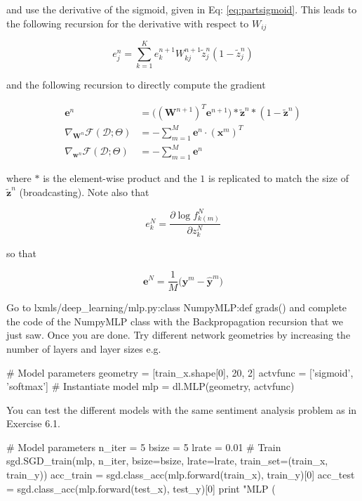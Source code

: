 \noindent and use the derivative of the sigmoid, given in Eq: \ref{eq:partsigmoid}. This leads to the following recursion for the derivative with respect to $W_{ij}$

\begin{equation}
e^{n}_j = \sum_{k=1}^K e^{n+1}_k W_{kj}^{n+1}\tilde{z}^n_{j}(1-\tilde{z}^n_{j})
\end{equation}

\noindent and the following recursion to directly compute the gradient

\begin{align}
\mathbf{e}^{n} & = \Big((\mathbf{W}^{n+1})^T \mathbf{e}^{n+1}\Big) \ast \tilde{\mathbf{z}}^n \ast (1-\tilde{\mathbf{z}}^n)\\
\nabla_{\mathbf{W}^n}\mathcal{F}(\mathcal{D};\Theta) & = -\sum_{m=1}^M \mathbf{e}^{n} \cdot \left(\mathbf{x}^m\right)^T \\ 
\nabla_{\mathbf{w}^n}\mathcal{F}(\mathcal{D};\Theta) & = -\sum_{m=1}^M \mathbf{e}^{n}  
\end{align}

\noindent where $\ast$ is the element-wise product and the $1$ is replicated to match the size of $\tilde{\mathbf{z}}^n$ (broadcasting). Note also that 

\begin{equation}
e^N_k = \frac{\partial \log f_{k(m)}^N}{\partial z^{N}_{k}}  
\label{eq:finalError}
\end{equation}

\noindent so that

\begin{equation}
\mathbf{e}^N =\frac{1}{M}\Big(\mathbf{y}^m - \hat{\mathbf{y}}^m \Big)  
\end{equation}

\begin{exercise}
Go to lxmls/deep\_learning/mlp.py:class NumpyMLP:def grads() and complete the code of the NumpyMLP class with the Backpropagation recursion that we just saw. Once you are done. Try different network geometries by increasing the number of layers and layer sizes e.g.
\begin{python}
# Model parameters
geometry = [train_x.shape[0], 20, 2]
actvfunc = ['sigmoid', 'softmax'] 
# Instantiate model
mlp      = dl.MLP(geometry, actvfunc) 
\end{python}
You can test the different models with the same sentiment analysis problem as in Exercise 6.1. 
\begin{python}
# Model parameters
n_iter = 5
bsize  = 5
lrate  = 0.01
# Train
sgd.SGD_train(mlp, n_iter, bsize=bsize, lrate=lrate, train_set=(train_x, train_y))
acc_train = sgd.class_acc(mlp.forward(train_x), train_y)[0]
acc_test  = sgd.class_acc(mlp.forward(test_x), test_y)[0]
print "MLP (%
\end{python}
\end{exercise}

